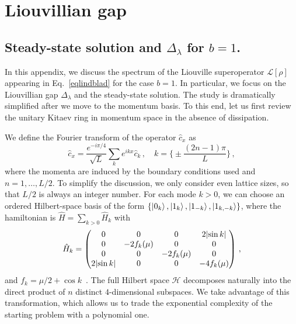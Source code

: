 \chapter{Liouvillian gap}
\label{appa}


\section{Steady-state solution and $\Delta_\lambda$ for $b=1$.}
\label{sec_steadystate}
In this appendix, we discuss the spectrum of the Liouville superoperator $\mathcal{L}[\rho]$ appearing in Eq.~\eqref{eqlindblad} for the case $b=1$. In particular, we focus on the Liouvillian gap $\Delta_\lambda$ and the steady-state solution. The study is dramatically simplified after we move to the momentum basis. To this end, let us first review the unitary Kitaev ring in momentum space in the absence of dissipation. 

We define the Fourier transform of the operator $\hat{c}_x$ as~\cite{NRV-2019-competingdissipativeandcoherent}
\begin{equation}
    \hat{c}_x=\frac{e^{-i\pi/4}}{\sqrt{L}}\sum_{k}e^{ikx}\hat{c}_k\,, \quad k=\bigg\{\pm\frac{(2n-1)\pi}{L}\bigg\}\,,
\end{equation}
where the momenta are induced by the boundary conditions used and $n=1,\dots, L/2$. To simplify the discussion, we only consider even lattice sizes, so that $L/2$ is always an integer number. For each mode $k>0$, we can choose an ordered Hilbert-space basis of the form $\{\ket{0_k},\ket{1_k},\ket{1_{-k}}, \ket{1_{k,-k}}\}$, where the hamiltonian is $\hat{H}=\sum_{k>0}\hat{H}_k$ with
\begin{equation}
    \hat{H}_k=\begin{pmatrix}
    0 & 0 & 0 & 2\lvert\sin k\rvert\\
    0 & -2f_k(\mu) & 0 & 0\\
    0& 0 & -2f_k(\mu)&0\\
    2\lvert\sin k\rvert& 0& 0& -4f_k(\mu)\\
    \end{pmatrix}\,,
    \label{eq_app_Hk_b1}
\end{equation}
and $f_k=\mu/2+\cos k$~\cite{NRV-2019-competingdissipativeandcoherent, P-2008-thirdquantization}. The full Hilbert space $\mathcal{H}$ decomposes naturally into the direct product of $n$ distinct $4$-dimensional subspaces. We take advantage of this transformation, which allows us to trade the exponential complexity of the starting problem with a polynomial one. 

